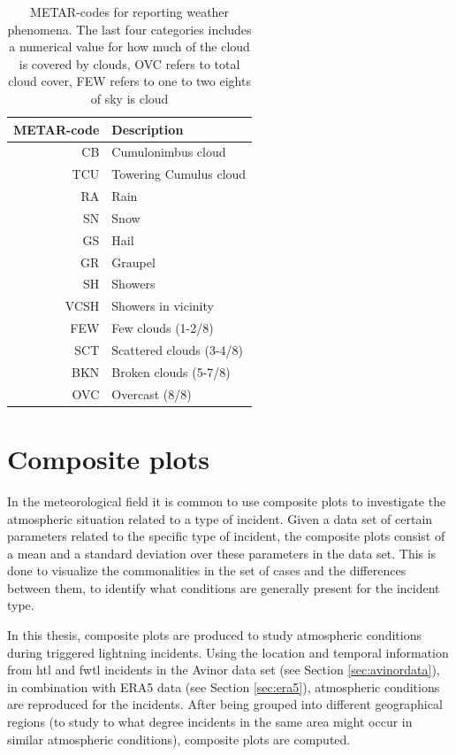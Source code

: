 \begin{table}
    \centering
    \begin{tabular}{r|l}
        METAR-code & Description \\
        \hline
        CB & Cumulonimbus cloud \\
        TCU & Towering Cumulus cloud\\
        RA & Rain \\
        SN & Snow  \\
        GS & Hail \\
        GR & Graupel \\
        SH & Showers    \\
        VCSH & Showers in vicinity \\
        FEW & Few clouds (1-2/8)\\
        SCT & Scattered clouds (3-4/8)\\
        BKN & Broken clouds (5-7/8)\\
        OVC & Overcast (8/8)\\
    \end{tabular}
    \caption{METAR-codes for reporting weather phenomena. The last four categories includes a numerical value for how much of the cloud is covered by clouds, OVC refers to total cloud cover, FEW refers to one to two eights of sky is cloud }
    \label{tab:METAR-table}
\end{table}

\section{Composite plots}\label{sec:composite}
In the meteorological field it is common to use composite plots to investigate the atmospheric situation related to a type of incident. Given a data set of certain parameters related to the specific type of incident, the composite plots consist of a mean and a standard deviation over these parameters in the data set. This is done to visualize the commonalities in the set of cases and the differences between them, to identify what conditions are generally present for the incident type. 

In this thesis, composite plots are produced to study atmospheric conditions during triggered lightning incidents. Using the location and temporal information from \acrshort{htl} and \acrshort{fwtl} incidents in the Avinor data set (see Section \ref{sec:avinordata}), in combination with ERA5 data (see Section \ref{sec:era5}), atmospheric conditions are reproduced for the incidents. After being grouped into different geographical regions (to study to what degree incidents in the same area might occur in similar atmospheric conditions), composite plots are computed.

